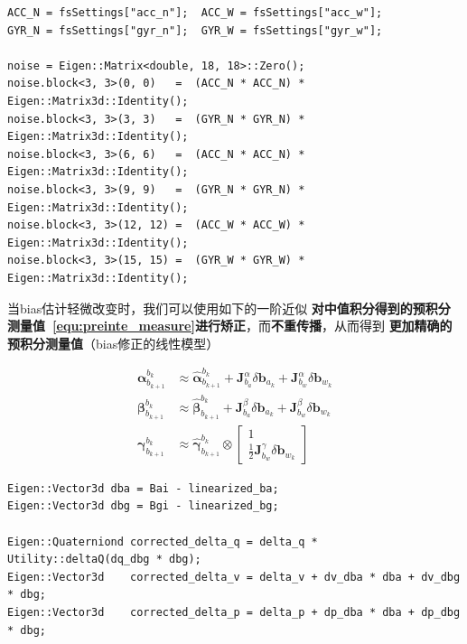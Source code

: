 \documentclass[12pt,a4paper]{article}
\begin{document}
\begin{lstlisting}
ACC_N = fsSettings["acc_n"];  ACC_W = fsSettings["acc_w"];
GYR_N = fsSettings["gyr_n"];  GYR_W = fsSettings["gyr_w"];

noise = Eigen::Matrix<double, 18, 18>::Zero();
noise.block<3, 3>(0, 0)   =  (ACC_N * ACC_N) * Eigen::Matrix3d::Identity();
noise.block<3, 3>(3, 3)   =  (GYR_N * GYR_N) * Eigen::Matrix3d::Identity();
noise.block<3, 3>(6, 6)   =  (ACC_N * ACC_N) * Eigen::Matrix3d::Identity();
noise.block<3, 3>(9, 9)   =  (GYR_N * GYR_N) * Eigen::Matrix3d::Identity();
noise.block<3, 3>(12, 12) =  (ACC_W * ACC_W) * Eigen::Matrix3d::Identity();
noise.block<3, 3>(15, 15) =  (GYR_W * GYR_W) * Eigen::Matrix3d::Identity();
\end{lstlisting}

当bias估计轻微改变时，我们可以使用如下的一阶近似 \textbf{对中值积分得到的预积分测量值~\eqref{equ:preinte_measure}进行矫正}，而\textbf{不重传播}，从而得到 \textbf{更加精确的预积分测量值}（bias修正的线性模型）

\begin{equation}
\begin{aligned} 
\boldsymbol{\alpha}_{b_{k+1}}^{b_{k}} & \approx 
\hat{\boldsymbol{\alpha}}_{b_{k+1}}^{b_{k}}+
\mathbf{J}_{b_{a}}^{\alpha} \delta \mathbf{b}_{a_{k}}+
\mathbf{J}_{b_{w}}^{\alpha} \delta \mathbf{b}_{w_{k}} \\ 
\boldsymbol{\beta}_{b_{k+1}}^{b_{k}} & \approx 
\hat{\boldsymbol{\beta}}_{b_{k+1}}^{b_{k}}+
\mathbf{J}_{b_{a}}^{\beta} \delta \mathbf{b}_{a_{k}}+
\mathbf{J}_{b_{w}}^{\beta} \delta \mathbf{b}_{w_{k}} \\ 
\boldsymbol{\gamma}_{b_{k+1}}^{b_{k}} & \approx 
\hat{\boldsymbol{\gamma}}_{b_{k+1}}^{b_{k}} \otimes
\left[\begin{array}{c}{1} \\ 
{\frac{1}{2} \mathbf{J}_{b_{w}}^{\gamma} \delta \mathbf{b}_{w_{k}}}\end{array}\right] 
\end{aligned}
\end{equation}

\begin{lstlisting}
Eigen::Vector3d dba = Bai - linearized_ba;
Eigen::Vector3d dbg = Bgi - linearized_bg;

Eigen::Quaterniond corrected_delta_q = delta_q * Utility::deltaQ(dq_dbg * dbg);
Eigen::Vector3d    corrected_delta_v = delta_v + dv_dba * dba + dv_dbg * dbg;
Eigen::Vector3d    corrected_delta_p = delta_p + dp_dba * dba + dp_dbg * dbg;
\end{lstlisting}
\end{document}
